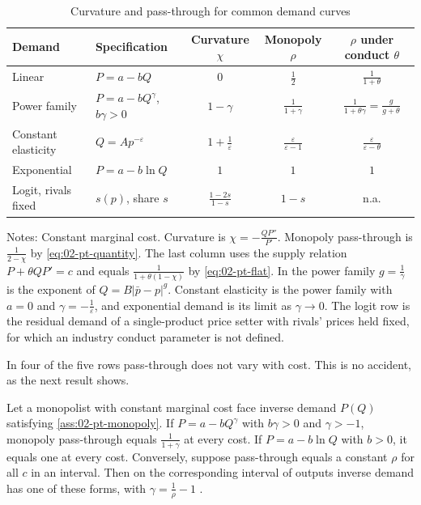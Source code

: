 \begin{table}[htbp]
\centering
\caption{Curvature and pass-through for common demand curves}
\label{tab:02-pt-examples}
\begin{threeparttable}
\begin{tabular}{@{}llccc@{}}
\toprule
Demand & Specification & Curvature $\chi$ & Monopoly $\rho$ & $\rho$ under conduct $\theta$ \\
\midrule
Linear & $P = a - bQ$ & $0$ & $\frac{1}{2}$ & $\frac{1}{1 + \theta}$ \\[4pt]
Power family & $P = a - bQ^{\gamma}$, $b\gamma > 0$ & $1 - \gamma$ & $\frac{1}{1 + \gamma}$ &
  $\frac{1}{1 + \theta\gamma} = \frac{g}{g + \theta}$ \\[4pt]
Constant elasticity & $Q = Ap^{-\varepsilon}$ & $1 + \frac{1}{\varepsilon}$ & $\frac{\varepsilon}{\varepsilon - 1}$ &
  $\frac{\varepsilon}{\varepsilon - \theta}$ \\[4pt]
Exponential & $P = a - b\ln Q$ & $1$ & $1$ & $1$ \\[4pt]
Logit, rivals fixed & $s(p)$, share $s$ & $\frac{1 - 2s}{1 - s}$ & $1 - s$ & n.a. \\
\bottomrule
\end{tabular}
\begin{tablenotes}[flushleft]
\footnotesize
\item Notes: Constant marginal cost. Curvature is $\chi = -\frac{QP''}{P'}$. Monopoly pass-through is
$\frac{1}{2 - \chi}$ by \eqref{eq:02-pt-quantity}. The last column uses the supply relation
$P + \theta QP' = c$ and equals $\frac{1}{1 + \theta(1 - \chi)}$ by \eqref{eq:02-pt-flat}. In the power family
$g = \frac{1}{\gamma}$ is the exponent of $Q = B\lvert\bar p - p\rvert^{g}$. Constant elasticity is the power family with
$a = 0$ and $\gamma = -\frac{1}{\varepsilon}$, and exponential demand is its limit as $\gamma \to 0$. The logit
row is the residual demand of a single-product price setter with rivals' prices held fixed, for which an
industry conduct parameter is not defined.
\end{tablenotes}
\end{threeparttable}
\end{table}

In four of the five rows pass-through does not vary with cost. This is no accident, as the next result shows.

\begin{proposition}\label{prop:02-pt-constant}
Let a monopolist with constant marginal cost face inverse demand $P(Q)$ satisfying \cref{ass:02-pt-monopoly}.
If $P = a - bQ^{\gamma}$ with $b\gamma > 0$ and $\gamma > -1$, monopoly pass-through equals
$\frac{1}{1 + \gamma}$ at every cost. If $P = a - b\ln Q$ with $b > 0$, it equals one at every cost. Conversely,
suppose pass-through equals a constant $\rho$ for all $c$ in an interval. Then on the corresponding interval of
outputs inverse demand has one of these forms, with $\gamma = \frac{1}{\rho} - 1$ \citep{BulowPfleiderer1983}.
\end{proposition}

